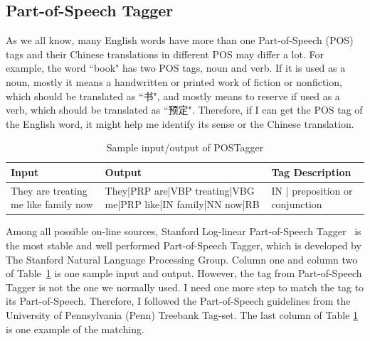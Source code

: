 \subsection{Part-of-Speech Tagger}
As we all know, many English words have more than one Part-of-Speech (POS) tags and their Chinese translations in different POS may differ a lot. For example, the word ``book" has two POS tags, noun and verb. If it is used as a noun, mostly it means a handwritten or printed work of fiction or nonfiction, which should be translated as ``书", and mostly means to reserve if used as a verb, which should be translated as ``预定". Therefore, if I can get the POS tag of the English word, it might help me identify its sense or the Chinese translation.

\begin{table}[ht]
    \caption{Sample input/output of POSTagger}
    \label{table:part_of_speech}
    \begin{center}
    \begin{tabular}{| p{1.5cm} | p{2.5cm} | p{2.2cm} |}
        \hline
        Input & Output & Tag Description \\
        \hline
        They are treating me like family now & They|PRP are|VBP treating|VBG me|PRP like|IN family|NN now|RB & IN | preposition or conjunction\\
        \hline
    \end{tabular}
    \end{center}
\end{table}

Among all possible on-line sources, Stanford Log-linear Part-of-Speech Tagger~\cite{Toutanova2003} is the most stable and well performed Part-of-Speech Tagger, which is developed by The Stanford Natural Language Processing Group. Column one and column two of Table~\ref{table:part_of_speech} is one sample input and output. However, the tag from Part-of-Speech Tagger is not the one we normally used. I need one more step to match the tag to its Part-of-Speech. Therefore, I followed the Part-of-Speech guidelines from the University of Pennsylvania (Penn) Treebank Tag-set. The last column of Table \ref{table:part_of_speech} is one example of the matching.

